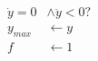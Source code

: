 \documentclass[10pt]{article}
\begin{document}
\begin{align*}\dot{y}=0 &\wedge \ddot{y}<0?\\
y_{max}&\leftarrow y\\
f &\leftarrow 1\end{align*}
\end{document}
